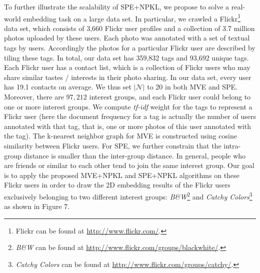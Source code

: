 To further illustrate the scalability of SPE+NPKL, we propose to solve a real-world embedding task on a large data set. In particular, we crawled a Flickr\footnote{Flickr can be found at \url{http://www.flickr.com/}.} data set, which consists of 3,660 Flickr user profiles and a collection of 3.7 million photos uploaded by these users. Each photo was annotated with a set of textual tags by users. Accordingly the photos for a particular Flickr user are described by tiling these tags. In total, our data set has 359,832 tags and 93,692 unique tags. Each Flickr user has a contact list, which is a collection of Flickr users who may share similar tastes / interests in their photo sharing. In our data set, every user has 19.1 contacts on average. We thus set $|\mathcal N|$ to 20 in both MVE and SPE. Moreover, there are $97,212$ interest groups, and each Flickr user could belong to one or more interest groups. We compute {\em tf-idf} weight for the tags to represent a Flickr user (here the document frequency for a tag is actually the number of users annotated with that tag, that is, one or more photos of this user annotated with the tag). The k-nearest neighbor graph for MVE is constructed using cosine similarity between Flickr users. For SPE, we further constrain that the intra-group distance is smaller than the inter-group distance. In general, people who are friends or similar to each other tend to join the same interest group. Our goal is to apply the proposed MVE+NPKL and SPE+NPKL algorithms on these Flickr users in order to draw the 2D embedding results of the Flickr users exclusively belonging to two different interest groups: {\em B\&W}\footnote{{\em B\&W} can be found at \url{http://www.flickr.com/groups/blackwhite/}.} and {\em Catchy Colors}\footnote{{\em Catchy Colors} can be found at \url{http://www.flickr.com/groups/catchy/}.} as shown in Figure 7.

